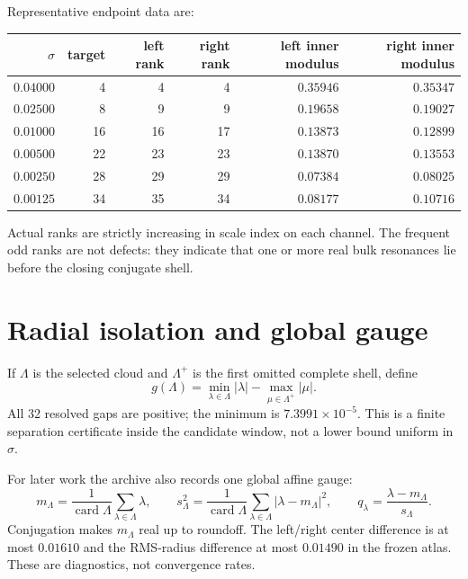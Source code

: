 \documentclass[11pt]{article}
\theoremstyle{remark}\newtheorem{remark}[theorem]{Remark}
\newcommand{\card}{\operatorname{card}}
\begin{document}
Representative endpoint data are:
\begin{center}
\begin{tabular}{rrrrrr}
\toprule
$\sigma$ & target & left rank & right rank &
left inner modulus & right inner modulus\\
\midrule
$0.04000$ & 4  & 4  & 4  & $0.35946$ & $0.35347$\\
$0.02500$ & 8  & 9  & 9  & $0.19658$ & $0.19027$\\
$0.01000$ & 16 & 16 & 17 & $0.13873$ & $0.12899$\\
$0.00500$ & 22 & 23 & 23 & $0.13870$ & $0.13553$\\
$0.00250$ & 28 & 29 & 29 & $0.07384$ & $0.08025$\\
$0.00125$ & 34 & 35 & 34 & $0.08177$ & $0.10716$\\
\bottomrule
\end{tabular}
\end{center}

Actual ranks are strictly increasing in scale index on each channel. The
frequent odd ranks are not defects: they indicate that one or more real bulk
resonances lie before the closing conjugate shell.

\section{Radial isolation and global gauge}

If $\Lambda$ is the selected cloud and $\Lambda^+$ is the first omitted
complete shell, define
\begin{equation}
 g(\Lambda)=\min_{\lambda\in\Lambda}|\lambda|
 -\max_{\mu\in\Lambda^+}|\mu|.
\end{equation}
All 32 resolved gaps are positive; the minimum is
$7.3991\times10^{-5}$. This is a finite separation certificate inside the
candidate window, not a lower bound uniform in $\sigma$.

For later work the archive also records one global affine gauge:
\begin{equation}\label{eq:gauge}
 m_\Lambda=\frac1{\card\Lambda}\sum_{\lambda\in\Lambda}\lambda,\qquad
 s_\Lambda^2=\frac1{\card\Lambda}
 \sum_{\lambda\in\Lambda}|\lambda-m_\Lambda|^2,
 \qquad q_\lambda=\frac{\lambda-m_\Lambda}{s_\Lambda}.
\end{equation}
Conjugation makes $m_\Lambda$ real up to roundoff. The left/right center
difference is at most $0.01610$ and the RMS-radius difference at most
$0.01490$ in the frozen atlas. These are diagnostics, not convergence rates.
\end{document}
